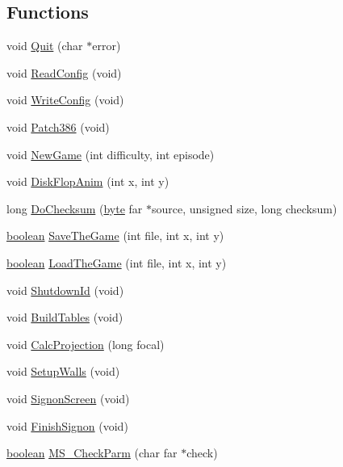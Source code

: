 \subsection*{Functions}
\begin{DoxyCompactItemize}
\item 
void \hyperlink{WL__MAIN_8C_a66ba47a93e3e25204f4d72aee7614201}{Quit} (char $\ast$error)
\item 
void \hyperlink{WL__MAIN_8C_a147bf0e6c60e52a87c9c0947cb64d2d5}{ReadConfig} (void)
\item 
void \hyperlink{WL__MAIN_8C_ab82705424ddc91b0a7d3c5fa8420640d}{WriteConfig} (void)
\item 
void \hyperlink{WL__MAIN_8C_a5e78460b9244f183fd88b4549a6cf34d}{Patch386} (void)
\item 
void \hyperlink{WL__MAIN_8C_af92c774866a68ff0737e216e1a7d09b2}{NewGame} (int difficulty, int episode)
\item 
void \hyperlink{WL__MAIN_8C_af2deb5787535cc63a689ba47c789b23f}{DiskFlopAnim} (int x, int y)
\item 
long \hyperlink{WL__MAIN_8C_a98c4c37b0ca7531f6c88b4433696c199}{DoChecksum} (\hyperlink{ID__HEAD_8H_a0c8186d9b9b7880309c27230bbb5e69d}{byte} far $\ast$source, unsigned size, long checksum)
\item 
\hyperlink{ID__HEAD_8H_a7c6368b321bd9acd0149b030bb8275ed}{boolean} \hyperlink{WL__MAIN_8C_a4ba711129ae29569db9f9ee134a2779d}{SaveTheGame} (int file, int x, int y)
\item 
\hyperlink{ID__HEAD_8H_a7c6368b321bd9acd0149b030bb8275ed}{boolean} \hyperlink{WL__MAIN_8C_adff0b7d9c79b6ba94151102b17d7e8d2}{LoadTheGame} (int file, int x, int y)
\item 
void \hyperlink{WL__MAIN_8C_a715f77542ce1f3db369235ae2d841d2e}{ShutdownId} (void)
\item 
void \hyperlink{WL__MAIN_8C_aebfb7b9493a691dd53697b23e3189822}{BuildTables} (void)
\item 
void \hyperlink{WL__MAIN_8C_a82156c01cf0c6b616ccb2bc2dff569a6}{CalcProjection} (long focal)
\item 
void \hyperlink{WL__MAIN_8C_add5a4289c1da44215930d60d42f550ae}{SetupWalls} (void)
\item 
void \hyperlink{WL__MAIN_8C_a88d551c35376f2082704379c45c542ec}{SignonScreen} (void)
\item 
void \hyperlink{WL__MAIN_8C_a7f8b2d1f1ff753b4eb38f74d62f2f14f}{FinishSignon} (void)
\item 
\hyperlink{ID__HEAD_8H_a7c6368b321bd9acd0149b030bb8275ed}{boolean} \hyperlink{WL__MAIN_8C_af7f72d25165824640d12bb37c6d11a23}{MS\_\-CheckParm} (char far $\ast$check)

\end{DoxyCompactItemize}
